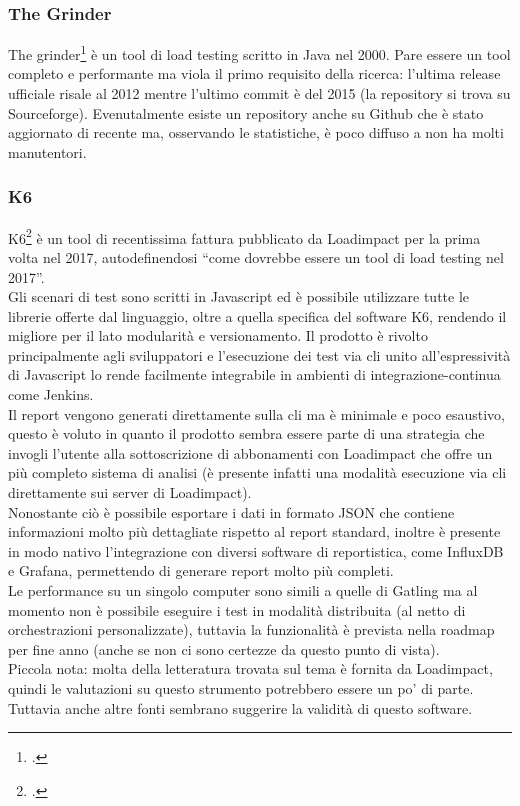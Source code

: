 \subsubsection{The Grinder}
The grinder\footcite{site:thegrinder} è un tool di load testing scritto in Java nel 2000. Pare essere un tool completo e performante ma viola il primo requisito della ricerca: l’ultima release ufficiale risale al 2012 mentre l’ultimo commit è del 2015 (la repository si trova su Sourceforge).
Evenutalmente esiste un repository anche su Github che è stato aggiornato di recente ma, osservando le statistiche, è poco diffuso a non ha molti manutentori.
\subsubsection{K6}
K6\footcite{site:k6} è un tool di recentissima fattura pubblicato da Loadimpact per la prima volta nel 2017, autodefinendosi “come dovrebbe essere un tool di load testing nel 2017”. \\
Gli scenari di test sono scritti in Javascript ed è possibile utilizzare tutte le librerie offerte dal linguaggio, oltre a quella specifica del software K6, rendendo il migliore per il lato modularità e versionamento. Il prodotto è rivolto principalmente agli sviluppatori e l’esecuzione dei test via \gls{cli} unito all'espressività di Javascript lo rende facilmente integrabile in ambienti di \gls{integrazione-continua} come Jenkins. \\
Il report vengono generati direttamente sulla \gls{cli} ma è minimale e poco esaustivo, questo è voluto in quanto il prodotto sembra essere parte di una strategia che invogli l’utente alla sottoscrizione di abbonamenti con Loadimpact che offre un più completo sistema di analisi (è presente infatti una modalità esecuzione via \gls{cli} direttamente sui server di Loadimpact). \\
Nonostante ciò è possibile esportare i dati in formato JSON che contiene informazioni molto più dettagliate rispetto al report standard, inoltre è presente in modo nativo l'integrazione con diversi software di reportistica, come InfluxDB e Grafana, permettendo di generare report molto più completi.\\
Le performance su un singolo computer sono simili a quelle di Gatling ma al momento non è possibile eseguire i test in modalità distribuita (al netto di orchestrazioni personalizzate), tuttavia la funzionalità è prevista nella roadmap per fine anno (anche se non ci sono certezze da questo punto di vista). \\
Piccola nota: molta della letteratura trovata sul tema è fornita da Loadimpact, quindi le valutazioni su questo strumento potrebbero essere un po’ di parte. Tuttavia anche altre fonti sembrano suggerire la validità di questo software.
